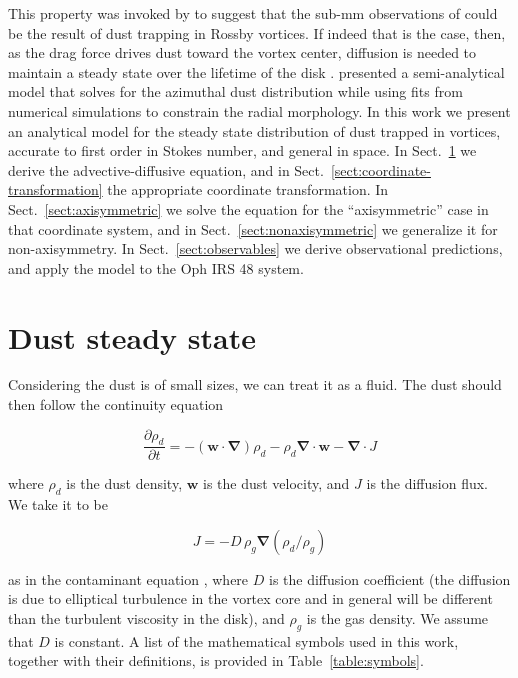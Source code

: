 \documentclass[apj]{emulateapj}
\newcommand{\pderiv}[2]{\frac{\partial #1}{\partial #2}}
\renewcommand{\v}[1]{{\boldsymbol{#1}}} %
\def\blue#1{\textcolor{blue}{ #1}}
\newcommand{\del}{\v{\nabla}}
\newcommand{\grad}{\del}
\newcommand{\Div}{\del\cdot}
\newcommand{\sect}[1]{Sect.~\ref{#1}}
\newcommand{\beq}{\begin{equation}}
\newcommand{\eeq}{\end{equation}}
\begin{document}
This property was invoked by \citet{Regaly12} to suggest that the 
sub-mm observations of \citet{Brown09} could be the result of dust
trapping in Rossby vortices. If indeed that is the case, then, 
as the drag force drives dust toward the vortex center, diffusion is
needed to maintain a steady state over the lifetime of the disk
\citep{Klahr-Henning97,Chavanis00}. \citet{Birnstiel13} presented a semi-analytical model that solves for the azimuthal dust 
distribution while using fits from numerical simulations
\citep{Pinilla12b} to constrain the radial morphology. In this work we present an analytical 
model for the steady state distribution of dust trapped in vortices, 
accurate to first order in Stokes number, and general in space. In 
\sect{sect:model-equations} we derive the
advective-diffusive equation, and in \sect{sect:coordinate-transformation} the appropriate coordinate
transformation. In \sect{sect:axisymmetric} we solve the equation for
the ``axisymmetric'' case in that coordinate system, and in
\sect{sect:nonaxisymmetric}  we generalize it for
non-axisymmetry. In \sect{sect:observables} 
we derive observational predictions, and apply the model to the Oph IRS 48 system.

\section{Dust steady state} 
\label{sect:model-equations}

Considering the dust is of small sizes, we can treat it as a
fluid. The dust should then follow the continuity equation 

\beq
  \pderiv{\rho_d}{t} = -(\v{w}\cdot\del)\rho_d - \rho_d \Div{\v{w}} - \Div{J}
  \label{eq:continuity-w}
\eeq

\noindent where $\rho_d$ is the dust density, $\v{w}$ is the dust
velocity, and $J$ is the diffusion flux. We take it to be
 
\beq 
J=-D\,\rho_g\grad{\left(\rho_d/\rho_g\right)}\label{eq:j-flux}
\eeq 

\noindent as in the contaminant equation
\citep{Morfill-Volk84,Clarke-Pringle88,Charnoz11}, where $D$ is the  
diffusion coefficient (the diffusion is due
to elliptical turbulence in the vortex core and in general will be
different than the turbulent viscosity in the disk), and $\rho_g$ is
the gas density. We assume that $D$ is constant. A list of the mathematical symbols used in this work, together
with their definitions, is provided in Table~\ref{table:symbols}. 
\end{document}
